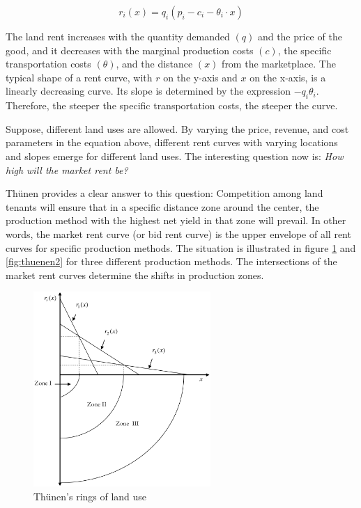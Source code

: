 \documentclass[
  12pt,
  oneside]{book}
\theoremstyle{definition}
\theoremstyle{definition}
\theoremstyle{definition}
\theoremstyle{definition}
\theoremstyle{remark}
\begin{document}
\[
r_i(x) = q_i(p_i - c_i - \theta_i \cdot x)
\]

The land rent increases with the quantity demanded \((q)\) and the price of the good, and it decreases with the marginal production costs \((c)\), the specific transportation costs \((\theta)\), and the distance \((x)\) from the marketplace. The typical shape of a rent curve, with \(r\) on the y-axis and \(x\) on the x-axis, is a linearly decreasing curve. Its slope is determined by the expression \(-q_i  \theta_i\). Therefore, the steeper the specific transportation costs, the steeper the curve.

Suppose, different land uses are allowed. By varying the price, revenue, and cost parameters in the equation above, different rent curves with varying locations and slopes emerge for different land uses. The interesting question now is: \emph{How high will the market rent be?}

Thünen provides a clear answer to this question: Competition among land tenants will ensure that in a specific distance zone around the center, the production method with the highest net yield in that zone will prevail. In other words, the market rent curve (or bid rent curve) is the upper envelope of all rent curves for specific production methods. The situation is illustrated in figure \ref{fig:thuenen} and \ref{fig:thuenen2} for three different production methods. The intersections of the market rent curves determine the shifts in production zones.

\begin{figure}
\centering
\includegraphics[width=0.6\textwidth,height=\textheight]{fig/thuenen.png}
\caption{\label{fig:thuenen} Thünen's rings of land use}
\end{figure}
\end{document}
